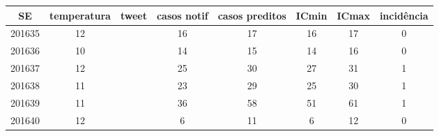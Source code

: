 \begin{tabular}{c|ccccccc}
  \hline
SE & temperatura & tweet & casos notif & casos preditos & ICmin & ICmax & incidência \\ 
  \hline
201635 & 12 &  & 16 & 17 & 16 & 17 & 0 \\ 
  201636 & 10 &  & 14 & 15 & 14 & 16 & 0 \\ 
  201637 & 12 &  & 25 & 30 & 27 & 31 & 1 \\ 
  201638 & 11 &  & 23 & 29 & 25 & 30 & 1 \\ 
  201639 & 11 &  & 36 & 58 & 51 & 61 & 1 \\ 
  201640 & 12 &  & 6 & 11 & 6 & 12 & 0 \\ 
   \hline
\end{tabular}
